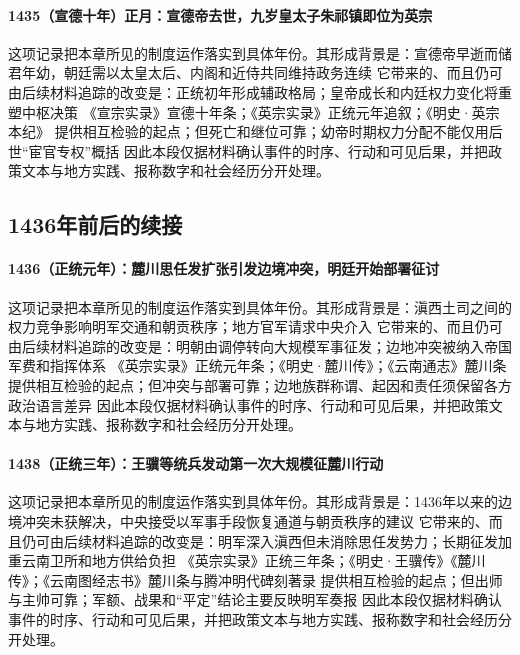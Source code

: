 \paragraph{1435（宣德十年）正月：宣德帝去世，九岁皇太子朱祁镇即位为英宗} 这项记录把本章所见的制度运作落实到具体年份。其形成背景是：宣德帝早逝而储君年幼，朝廷需以太皇太后、内阁和近侍共同维持政务连续 它带来的、而且仍可由后续材料追踪的改变是：正统初年形成辅政格局；皇帝成长和内廷权力变化将重塑中枢决策 《宣宗实录》宣德十年条；《英宗实录》正统元年追叙；《明史·英宗本纪》 提供相互检验的起点；但死亡和继位可靠；幼帝时期权力分配不能仅用后世“宦官专权”概括 因此本段仅据材料确认事件的时序、行动和可见后果，并把政策文本与地方实践、报称数字和社会经历分开处理。

\subsection{1436年前后的续接}

\paragraph{1436（正统元年）：麓川思任发扩张引发边境冲突，明廷开始部署征讨} 这项记录把本章所见的制度运作落实到具体年份。其形成背景是：滇西土司之间的权力竞争影响明军交通和朝贡秩序；地方官军请求中央介入 它带来的、而且仍可由后续材料追踪的改变是：明朝由调停转向大规模军事征发；边地冲突被纳入帝国军费和指挥体系 《英宗实录》正统元年条；《明史·麓川传》；《云南通志》麓川条 提供相互检验的起点；但冲突与部署可靠；边地族群称谓、起因和责任须保留各方政治语言差异 因此本段仅据材料确认事件的时序、行动和可见后果，并把政策文本与地方实践、报称数字和社会经历分开处理。

\paragraph{1438（正统三年）：王骥等统兵发动第一次大规模征麓川行动} 这项记录把本章所见的制度运作落实到具体年份。其形成背景是：1436年以来的边境冲突未获解决，中央接受以军事手段恢复通道与朝贡秩序的建议 它带来的、而且仍可由后续材料追踪的改变是：明军深入滇西但未消除思任发势力；长期征发加重云南卫所和地方供给负担 《英宗实录》正统三年条；《明史·王骥传》《麓川传》；《云南图经志书》麓川条与腾冲明代碑刻著录 提供相互检验的起点；但出师与主帅可靠；军额、战果和“平定”结论主要反映明军奏报 因此本段仅据材料确认事件的时序、行动和可见后果，并把政策文本与地方实践、报称数字和社会经历分开处理。

